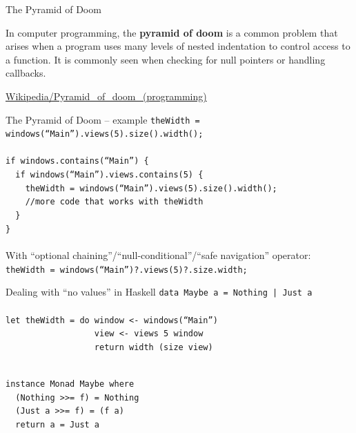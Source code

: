 \documentclass{beamer}
\begin{document}
\begin{frame}{The Pyramid of Doom}
  \begin{displayquote}
    In computer programming, the \textbf{pyramid of doom}
    is a common problem that arises when a program uses many
    levels of nested indentation to control access to a function.
    It is commonly seen when checking for null pointers or handling
    callbacks.
  \end{displayquote}
  
  \begin{flushright}
    {\footnotesize \href{https://en.wikipedia.org/wiki/Pyramid_of_doom_(programming)}{Wikipedia/Pyramid\_of\_doom\_(programming)}}
  \end{flushright}
\end{frame}

\begin{frame}{The Pyramid of Doom -- example} \pause
  {\footnotesize
    \texttt{theWidth = windows(``Main'').views(5).size().width();} \\ \pause
    \ \\
    \texttt{if windows.contains(``Main'') \{ \\
      \ \ if windows(``Main'').views.contains(5) \{ \\
      \ \ \ \ theWidth = windows(``Main'').views(5).size().width();\\
      \ \ \ \ //more code that works with theWidth\\
      \ \ \}\\
      \}\\
    } \pause
    \ \\
    With ``optional chaining''/``null-conditional''/``safe navigation''
    operator: \\ \pause
    \texttt{theWidth = windows(``Main'')?.views(5)?.size.width;}
  }
\end{frame}

\begin{frame}{Dealing with ``no values'' in Haskell} \pause
  \texttt{data Maybe a = Nothing | Just a} \\ \pause
  \ \\
  \texttt{let theWidth = do window <- windows(``Main'')\\
    \ \ \ \ \ \ \ \ \ \ \ \ \ \ \ \ \ \ view <- views 5 window\\
    \ \ \ \ \ \ \ \ \ \ \ \ \ \ \ \ \ \ return width (size view)\\
  } \ \\ \pause
  
  \texttt{instance Monad Maybe where\\ \pause
    \ \ (Nothing >>= f) = Nothing\\ \pause
    \ \ (Just a >>= f) = (f a)\\ \pause
    \ \ return a = Just a}
\end{frame}
\end{document}
